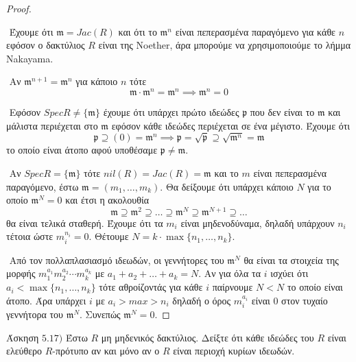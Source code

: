 \documentclass[oneside,a4paper]{article}
\newcommand {\tl}{\textlatin}
\begin{document}
\begin{proof} $ $

	$ $\newline
	Έχουμε ότι $\mathfrak{m} = Jac(R)$ και ότι το $\mathfrak{m}^n$ είναι πεπερασμένα παραγόμενο για κάθε $n$ εφόσον ο δακτύλιος $R$ είναι της \tl{Noether}, άρα μπορούμε να χρησιμοποιούμε το λήμμα \tl{Nakayama}.

	$ $\newline
	Αν $\mathfrak{m}^{n+1} = \mathfrak{m}^n$ για κάποιο $n$ τότε $$\mathfrak{m} \cdot \mathfrak{m}^n = \mathfrak{m}^n \implies \mathfrak{m}^n = 0$$

	$ $\newline
	Εφόσον $SpecR\neq\{\mathfrak{m}\}$ έχουμε ότι υπάρχει πρώτο ιδεώδες $\mathfrak{p}$ που δεν είναι το $\mathfrak{m}$ και μάλιστα περιέχεται στο $\mathfrak{m}$ εφόσον κάθε ιδεώδες περιέχεται σε ένα μέγιστο. Έχουμε ότι $$\mathfrak{p} \supseteq (0) = \mathfrak{m}^n \implies \mathfrak{p} = \sqrt{\mathfrak{p}} \supseteq \sqrt{\mathfrak{m}^n} = \mathfrak{m}$$
	το οποίο είναι άτοπο αφού υποθέσαμε $\mathfrak{p} \neq \mathfrak{m}$.

	$ $\newline
	Αν $SpecR= \{\mathfrak{m}\}$ τότε $nil(R) = Jac(R) = \mathfrak{m}$ και το $m$ είναι πεπερασμένα παραγόμενο, έστω $\mathfrak{m} = (m_1, \ldots, m_k)$. Θα δείξουμε ότι υπάρχει κάποιο $N$ για το οποίο $\mathfrak{m}^N = 0$ και έτσι η ακολουθία $$\mathfrak{m} \supseteq \mathfrak{m}^2 \supseteq \ldots \supseteq \mathfrak{m}^N \supseteq \mathfrak{m}^{N+1} \supseteq \ldots $$ θα είναι τελικά σταθερή. Έχουμε ότι τα $m_i$ είναι μηδενοδύναμα, δηλαδή υπάρχουν $n_i$ τέτοια ώστε $m^{n_i}_i = 0$. Θέτουμε $N= k \cdot \max \{n_1,\ldots,n_k\}$.

	$ $\newline
	Από τον πολλαπλασιασμό ιδεωδών, οι γεννήτορες του $\mathfrak{m}^N$ θα είναι τα στοιχεία της μορφής $m^{a_1}_1 m^{a_2}_2 \cdots m^{a_k}_k$ με $a_1 + a_2 + \ldots + a_k = N$. Αν για όλα τα $i$ ισχύει ότι $a_i < \max \{n_1,\ldots, n_k\}$ τότε αθροίζοντάς για κάθε $i$ παίρνουμε $N < N$ το οποίο είναι άτοπο. Άρα υπάρχει $i$ με $a_i > max > n_i$ δηλαδή ο όρος $m^{a_i}_i$ είναι $0$ στον τυχαίο γεννήτορα του $\mathfrak{m}^N$. Συνεπώς $\mathfrak{m}^N = 0$.  
\end{proof}
\pagebreak


\noindent Άσκηση $5.17)$
\quad Έστω $R$ μη μηδενικός δακτύλιος. Δείξτε ότι κάθε ιδεώδες του
$R$ είναι ελεύθερο $R$-πρότυπο αν και μόνο αν ο $R$ είναι περιοχή κυρίων ιδεωδών.
\end{document}
